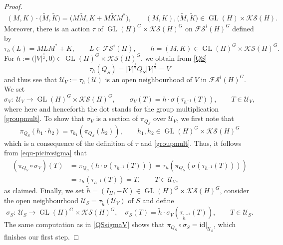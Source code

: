 \documentclass[pdftex]{sigma}
\numberwithin{equation}{section}
\theoremstyle{definition}
\DeclareMathOperator{\GL}{GL}
\begin{document}
\begin{proof}
\begin{align}\label{groupmult}
(M,K)\cdot \bigl(\tilde{M},\tilde{K}\bigr)=\bigl(M\tilde{M}, K+M\tilde{K}M^\ast\bigr),\qquad (M,K), \bigl(\tilde{M},\tilde{K}\bigr)\in\GL(H)\times\mathcal{KS}(H).
\end{align}
Moreover, there is an action $\tau$ of $\GL(H)^G\times\mathcal{KS}(H)^G$ on $\mathcal{FS}^i(H)^G$ defined by
\[\tau_{h}(L)= MLM^\ast+K,\qquad L\in\mathcal{FS}^i(H),\qquad h=(M,K)\in\GL(H)^G\times\mathcal{KS}(H)^G.\]
For $h:=\bigl(|V|^\frac{1}{2},0\bigr)\in \GL(H)^G\times\mathcal{KS}(H)^G$, we obtain from \eqref{QS}
\[\tau_h(Q_S)=|V|^\frac{1}{2}Q_S|V|^\frac{1}{2}=V\]
and thus see that $\mathcal{U}_V:=\tau_h(\mathcal{U})$ is an open neighbourhood of $V$ in $\mathcal{FS}^i(H)^G$. We set
\[\sigma_V \colon \ \mathcal{U}_V\rightarrow \GL(H)^G\times\mathcal{KS}(H)^G,\qquad \sigma_V(T)=h\cdot \sigma(\tau_{h^{-1}}(T)),\qquad T\in\mathcal{U}_V,\]
where here and henceforth the dot stands for the group multiplication \eqref{groupmult}. To show that $\sigma_V$ is a section of $\pi_{Q_S}$ over $\mathcal{U}_V$, we first note that
\[\pi_{Q_S}(h_1\cdot h_2)=\tau_{h_1}(\pi_{Q_S}(h_2)),\qquad h_1,h_2\in \GL(H)^G\times\mathcal{KS}(H)^G\]
which is a consequence of the definition of $\tau$ and \eqref{groupmult}. Thus, it follows from \eqref{equ-picircsigma} that
\begin{align}
(\pi_{Q_S}\circ\sigma_V)(T)&=\pi_{Q_S}(h\cdot \sigma(\tau_{h^{-1}}(T)))=\tau_h(\pi_{Q_S}(\sigma(\tau_{h^{-1}}(T))))\nonumber\\
&=\tau_h(\tau_{h^{-1}}(T))=T,\qquad T\in\mathcal{U}_V,\label{QSsigmaV}
\end{align}
as claimed. Finally, we set $\tilde{h}=(I_H,-K)\in \GL(H)^G\times\mathcal{KS}(H)^G$, consider the open neighbourhood $\mathcal{U}_S=\tau_{\tilde{h}}(\mathcal{U}_V)$ of $S$ and define
\[\sigma_S\colon \ \mathcal{U}_S\rightarrow \GL(H)^G\times\mathcal{KS}(H)^G,\quad \sigma_S(T)=\tilde{h}\cdot \sigma_V(\tau_{\tilde{h}^{-1}}(T)),\qquad T\in\mathcal{U}_S.\]
The same computation as in \eqref{QSsigmaV} shows that $\pi_{Q_S}\circ\sigma_S=\mathrm{id}|_{\mathcal{U}_S}$, which finishes our first step.


\end{proof}
\end{document}
